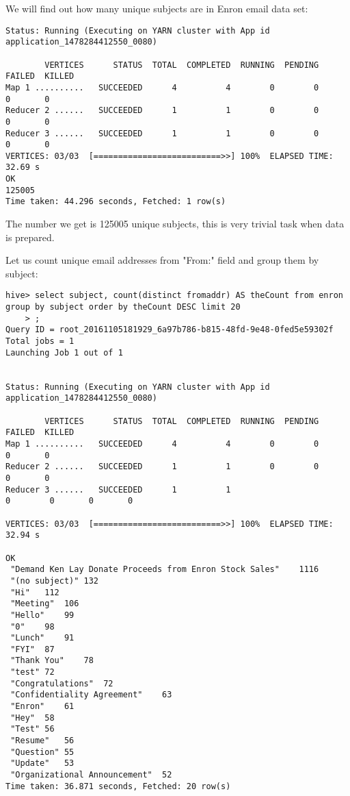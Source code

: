 \documentclass{llncs}
\begin{document}
We will find out how many unique subjects are in Enron email data set:
\begin{lstlisting}[caption={Hive output showing number of threads}, label={hiveout1}]
Status: Running (Executing on YARN cluster with App id application_1478284412550_0080)

        VERTICES      STATUS  TOTAL  COMPLETED  RUNNING  PENDING  FAILED  KILLED
Map 1 ..........   SUCCEEDED      4          4        0        0       0       0
Reducer 2 ......   SUCCEEDED      1          1        0        0       0       0
Reducer 3 ......   SUCCEEDED      1          1        0        0       0       0
VERTICES: 03/03  [==========================>>] 100%  ELAPSED TIME: 32.69 s
OK
125005
Time taken: 44.296 seconds, Fetched: 1 row(s)

\end{lstlisting}
The number we get is 125005 unique subjects, this is very trivial task when data is prepared.

Let us count unique email addresses from "From:" field and group them by subject:

\begin{lstlisting}[caption={This reducer is using mapper from step 1}, label={hivepopular}]
hive> select subject, count(distinct fromaddr) AS theCount from enron group by subject order by theCount DESC limit 20
    > ;
Query ID = root_20161105181929_6a97b786-b815-48fd-9e48-0fed5e59302f
Total jobs = 1
Launching Job 1 out of 1


Status: Running (Executing on YARN cluster with App id application_1478284412550_0080)

        VERTICES      STATUS  TOTAL  COMPLETED  RUNNING  PENDING  FAILED  KILLED
Map 1 ..........   SUCCEEDED      4          4        0        0       0       0
Reducer 2 ......   SUCCEEDED      1          1        0        0       0       0
Reducer 3 ......   SUCCEEDED      1          1
0        0       0       0

VERTICES: 03/03  [==========================>>] 100%  ELAPSED TIME: 32.94 s

OK
 "Demand Ken Lay Donate Proceeds from Enron Stock Sales"	1116
 "(no subject)"	132
 "Hi"	112
 "Meeting"	106
 "Hello"	99
 "0"	98
 "Lunch"	91
 "FYI"	87
 "Thank You"	78
 "test"	72
 "Congratulations"	72
 "Confidentiality Agreement"	63
 "Enron"	61
 "Hey"	58
 "Test"	56
 "Resume"	56
 "Question"	55
 "Update"	53
 "Organizational Announcement"	52
Time taken: 36.871 seconds, Fetched: 20 row(s)

\end{lstlisting}
\end{document}
